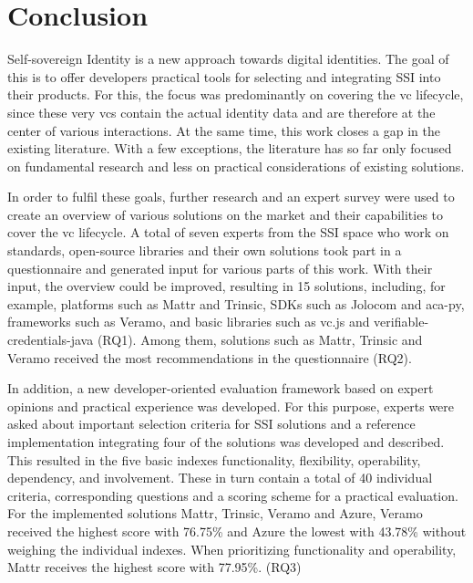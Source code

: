 \chapter{Conclusion}


Self-sovereign Identity is a new approach towards digital identities. The goal of this is to offer developers practical tools for selecting and integrating \ac{SSI} into their products. For this, the focus was predominantly on covering the \ac{vc} lifecycle, since these very \acp{vc} contain the actual identity data and are therefore at the center of various interactions. At the same time, this work closes a gap in the existing literature. With a few exceptions, the literature has so far only focused on fundamental research and less on practical considerations of existing solutions.

In order to fulfil these goals, further research and an expert survey were used to create an overview of various solutions on the market and their capabilities to cover the \ac{vc} lifecycle. A total of seven experts from the \ac{SSI} space who work on standards, open-source libraries and their own solutions took part in a questionnaire and generated input for various parts of this work. With their input, the overview could be improved, resulting in 15 solutions, including, for example, platforms such as Mattr and Trinsic, SDKs such as Jolocom and aca-py, frameworks such as Veramo, and basic libraries such as vc.js and verifiable-credentials-java (RQ1). Among them, solutions such as Mattr, Trinsic and Veramo received the most recommendations in the questionnaire (RQ2).

In addition, a new developer-oriented evaluation framework based on expert opinions and practical experience was developed. For this purpose, experts were asked about important selection criteria for \ac{SSI} solutions and a reference implementation integrating four of the solutions was developed and described. This resulted in the five basic indexes functionality, flexibility, operability, dependency, and involvement. These in turn contain a total of 40 individual criteria, corresponding questions and a scoring scheme for a practical evaluation. For the implemented solutions Mattr, Trinsic, Veramo and Azure, Veramo received the highest score with 76.75\% and Azure the lowest with 43.78\% without weighing the individual indexes. When prioritizing functionality and operability, Mattr receives the highest score with 77.95\%. (RQ3)

